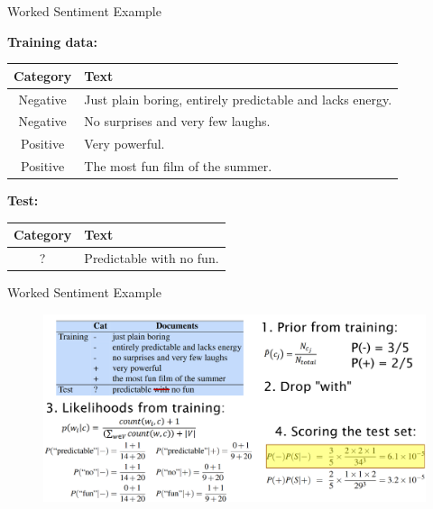 \documentclass[handout]{beamer}
\begin{document}
\begin{frame}{Worked Sentiment Example}

\textbf{Training data:} 

\begin{table}[h]
\centering
\begin{tabular}{|c|p{}|}
\hline
\textbf{Category} & \textbf{Text} \\
\hline
Negative & Just plain boring, entirely predictable and lacks energy. \\
\hline
Negative & No surprises and very few laughs. \\
\hline
Positive & Very powerful. \\
\hline
Positive & The most fun film of the summer. \\
\hline
\end{tabular}
\end{table}


\textbf{Test:} 
\begin{table}[h]
\centering
\begin{tabular}{|c|p{}|}
\hline
\textbf{Category} & \textbf{Text} \\
\hline
? & Predictable with no fun. \\
\hline
\end{tabular}
\end{table}

\end{frame}


\begin{frame}{Worked Sentiment Example}

\begin{figure}[h]
\includegraphics[scale = 0.23]{pics/naive_example.png}
\end{figure}

\end{frame}
\end{document}
